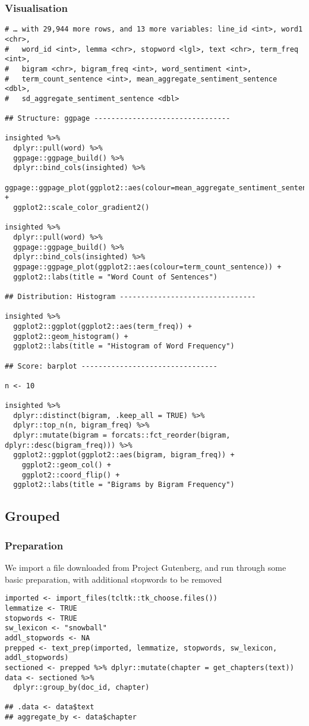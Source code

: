\documentclass[a4paper, 11pt]{article}
\begin{document}
\subsubsection{Visualisation}
\label{sec:orgbea0224}
\begin{verbatim}
# … with 29,944 more rows, and 13 more variables: line_id <int>, word1 <chr>,
#   word_id <int>, lemma <chr>, stopword <lgl>, text <chr>, term_freq <int>,
#   bigram <chr>, bigram_freq <int>, word_sentiment <int>,
#   term_count_sentence <int>, mean_aggregate_sentiment_sentence <dbl>,
#   sd_aggregate_sentiment_sentence <dbl>

## Structure: ggpage --------------------------------

insighted %>%
  dplyr::pull(word) %>%
  ggpage::ggpage_build() %>%
  dplyr::bind_cols(insighted) %>%
  ggpage::ggpage_plot(ggplot2::aes(colour=mean_aggregate_sentiment_sentence)) +
  ggplot2::scale_color_gradient2()

insighted %>%
  dplyr::pull(word) %>%
  ggpage::ggpage_build() %>%
  dplyr::bind_cols(insighted) %>%
  ggpage::ggpage_plot(ggplot2::aes(colour=term_count_sentence)) +
  ggplot2::labs(title = "Word Count of Sentences")

## Distribution: Histogram --------------------------------

insighted %>%
  ggplot2::ggplot(ggplot2::aes(term_freq)) +
  ggplot2::geom_histogram() +
  ggplot2::labs(title = "Histogram of Word Frequency")

## Score: barplot --------------------------------

n <- 10

insighted %>%
  dplyr::distinct(bigram, .keep_all = TRUE) %>%
  dplyr::top_n(n, bigram_freq) %>%
  dplyr::mutate(bigram = forcats::fct_reorder(bigram, dplyr::desc(bigram_freq))) %>%
  ggplot2::ggplot(ggplot2::aes(bigram, bigram_freq)) +
    ggplot2::geom_col() +
    ggplot2::coord_flip() +
  ggplot2::labs(title = "Bigrams by Bigram Frequency")
\end{verbatim}
\subsection{Grouped}
\label{sec:orgf8f16b9}
\subsubsection{Preparation}
\label{sec:org6d0c4ae}
We import a file downloaded from Project Gutenberg, and run through
some basic preparation, with additional stopwords to be removed
\begin{verbatim}
imported <- import_files(tcltk::tk_choose.files())
lemmatize <- TRUE
stopwords <- TRUE
sw_lexicon <- "snowball"
addl_stopwords <- NA
prepped <- text_prep(imported, lemmatize, stopwords, sw_lexicon, addl_stopwords)
sectioned <- prepped %>% dplyr::mutate(chapter = get_chapters(text))
data <- sectioned %>%
  dplyr::group_by(doc_id, chapter)

## .data <- data$text
## aggregate_by <- data$chapter
\end{verbatim}
\end{document}

